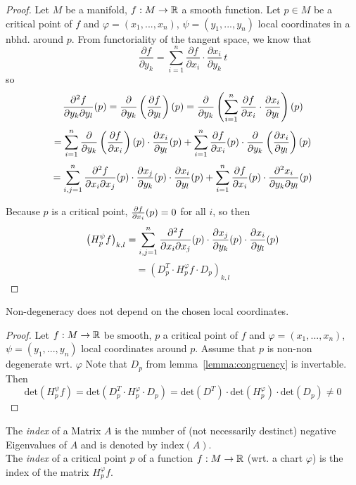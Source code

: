 \documentclass[a4paper,11pt]{article}
\begin{document}
\begin{proof}

   Let $M$ be a manifold, $f: M \rightarrow \R$ a smooth function.
   Let $p \in M$ be a critical point of $f$ and $\varphi = (x_1, ..., x_n)$, 
   $\psi = (y_1, ..., y_n)$ local coordinates in a nbhd. around $p$.
   From functoriality of the tangent space, we know that 
   \[ \frac{\partial f}{\partial y_k} = 
   \sum_{i=1}^n \frac{\partial f}{\partial x_i} \cdot \frac{\partial x_i}{\partial y_k} \,t \]
   so 
   \[ \pdderive[f]{y_k}{y_l} (p) 
   = \pderive{y_k} \left( \pderive[f]{y_l} \right) (p) 
   = \pderive{y_k} \left( \sum_{i=1}^n \pderive[f]{x_i} \cdot \pderive[x_i]{y_l} \right) (p) \]
   \[ = \sum_{i=1}^n \pderive{y_k} \left( \pderive[f]{x_i} \right) (p) \cdot \pderive[x_i]{y_l} (p) 
   + \sum_{i=1}^n \pderive[f]{x_i} (p) \cdot \pderive{y_k} \left( \pderive[x_i]{y_l} \right) (p) \]
   \[ = \sum_{i,j = 1}^n \pdderive[f]{x_i}{x_j} (p) \cdot \pderive[x_j]{y_k} (p) \cdot \pderive[x_i]{y_l}(p)
   + \sum_{i=1}^n \pderive[f]{x_i} (p) \cdot \pdderive[x_i]{y_k}{y_l}(p)\]
   
   Because $p$ is a critical point, $\pderive[f]{x_i} (p) = 0$ for all $i$, so then
   \[ \left( H_p^{\psi}f \right)_{k,l} 
   = \sum_{i,j = 1}^n \pdderive[f]{x_i}{x_j} (p) \cdot \pderive[x_j]{y_k}(p) \cdot \pderive[x_i]{y_l} (p) \]
   \[ = \left( D_p^T \cdot H_p^{\varphi}f \cdot D_p \right)_{k,l} \]

\end{proof}

\begin{lemma} 
   \label{lemma:non-degeneracy}
   Non-degeneracy does not depend on the chosen local coordinates.
\end{lemma}

\begin{proof}
   Let $f: M \rightarrow \R$ be smooth, $p$ a critical point of $f$ and 
   $\varphi = (x_1, ..., x_n)$, $\psi = (y_1, ..., y_n)$ local coordinates 
   around $p$. Assume that $p$ is non-non degenerate wrt. $\varphi$ Note that 
   $D_p$ from lemma~\ref{lemma:congruency} is invertable. Then
   \[ \text{det}(H_p^{\psi}f) = \text{det}(D_p^T \cdot H_p^{\varphi} \cdot D_p) = 
   \text{det}(D^T) \cdot \text{det}(H_p^{\varphi}) \cdot \text{det}(D_p) \neq 0 \]
\end{proof}

\begin{definition}[Index]
   \label{def:index}

   The \textit{index} of a Matrix $A$ is the number of (not necessarily 
   destinct) negative Eigenvalues of $A$ and is denoted by $\text{index}(A)$. \\
    The \textit{index} of a critical point $p$ of a function 
    $f: M \rightarrow \R$ (wrt. a chart $\varphi$) is the index of the matrix 
    $H_p^{\varphi}f$.
\end{definition}
\end{document}
